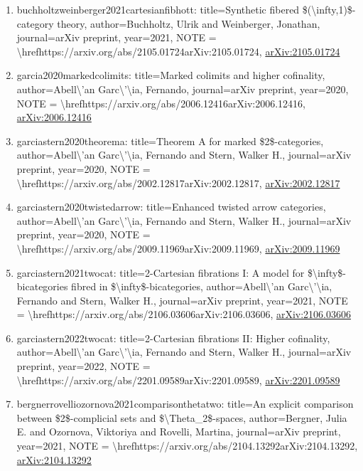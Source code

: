 \documentclass[11pt]{article}
\begin{document}
\begin{enumerate}[leftmargin=*]
  \item buchholtzweinberger2021cartesianfibhott: title=Synthetic fibered \$(\textbackslash{}infty,1)\$-category theory, author=Buchholtz, Ulrik and Weinberger, Jonathan, journal=arXiv preprint, year=2021, NOTE = \textbackslash{}hrefhttps://arxiv.org/abs/2105.01724arXiv:2105.01724, \href{https://arxiv.org/abs/2105.01724}{arXiv:2105.01724}
  \item garcia2020markedcolimits: title=Marked colimits and higher cofinality, author=Abell\textbackslash{}'an Garc\textbackslash{}'\textbackslash{}ia, Fernando, journal=arXiv preprint, year=2020, NOTE = \textbackslash{}hrefhttps://arxiv.org/abs/2006.12416arXiv:2006.12416, \href{https://arxiv.org/abs/2006.12416}{arXiv:2006.12416}
  \item garciastern2020theorema: title=Theorem A for marked \$2\$-categories, author=Abell\textbackslash{}'an Garc\textbackslash{}'\textbackslash{}ia, Fernando and Stern, Walker H., journal=arXiv preprint, year=2020, NOTE = \textbackslash{}hrefhttps://arxiv.org/abs/2002.12817arXiv:2002.12817, \href{https://arxiv.org/abs/2002.12817}{arXiv:2002.12817}
  \item garciastern2020twistedarrow: title=Enhanced twisted arrow categories, author=Abell\textbackslash{}'an Garc\textbackslash{}'\textbackslash{}ia, Fernando and Stern, Walker H., journal=arXiv preprint, year=2020, NOTE = \textbackslash{}hrefhttps://arxiv.org/abs/2009.11969arXiv:2009.11969, \href{https://arxiv.org/abs/2009.11969}{arXiv:2009.11969}
  \item garciastern2021twocat: title=2-Cartesian fibrations I: A model for \$\textbackslash{}infty\$-bicategories fibred in \$\textbackslash{}infty\$-bicategories, author=Abell\textbackslash{}'an Garc\textbackslash{}'\textbackslash{}ia, Fernando and Stern, Walker H., journal=arXiv preprint, year=2021, NOTE = \textbackslash{}hrefhttps://arxiv.org/abs/2106.03606arXiv:2106.03606, \href{https://arxiv.org/abs/2106.03606}{arXiv:2106.03606}
  \item garciastern2022twocat: title=2-Cartesian fibrations II: Higher cofinality, author=Abell\textbackslash{}'an Garc\textbackslash{}'\textbackslash{}ia, Fernando and Stern, Walker H., journal=arXiv preprint, year=2022, NOTE = \textbackslash{}hrefhttps://arxiv.org/abs/2201.09589arXiv:2201.09589, \href{https://arxiv.org/abs/2201.09589}{arXiv:2201.09589}
  \item bergnerrovelliozornova2021comparisonthetatwo: title=An explicit comparison between \$2\$-complicial sets and \$\textbackslash{}Theta\_2\$-spaces, author=Bergner, Julia E. and Ozornova, Viktoriya and Rovelli, Martina, journal=arXiv preprint, year=2021, NOTE = \textbackslash{}hrefhttps://arxiv.org/abs/2104.13292arXiv:2104.13292, \href{https://arxiv.org/abs/2104.13292}{arXiv:2104.13292}

\end{enumerate}
\end{document}
